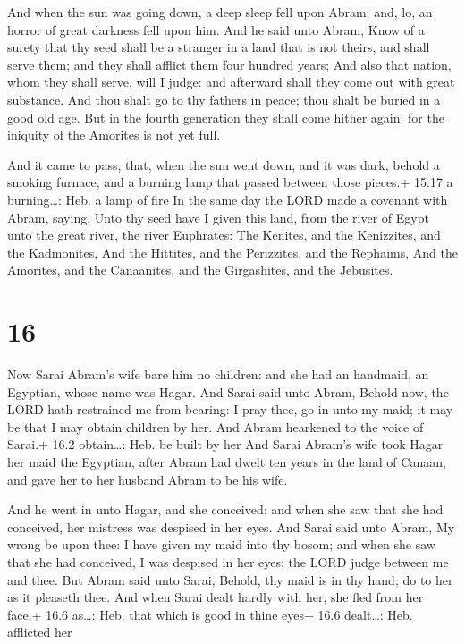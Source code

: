 And when the sun was going down, a deep sleep fell upon
Abram; and, lo, an horror of great darkness fell upon him. 
And he said unto Abram, Know of a surety that thy seed shall be a
stranger in a land that is not theirs, and shall serve them; and they
shall afflict them four hundred years;  And also that
nation, whom they shall serve, will I judge: and afterward shall they
come out with great substance.  And thou shalt go to thy
fathers in peace; thou shalt be buried in a good old age. 
But in the fourth generation they shall come hither again: for the
iniquity of the Amorites is not yet full.

 And it came to pass, that, when the sun went down, and it
was dark, behold a smoking furnace, and a burning lamp that passed
between those pieces.+ 15.17 a burning\ldots: Heb. a lamp of fire
 In the same day the LORD made a covenant with Abram,
saying, Unto thy seed have I given this land, from the river of Egypt
unto the great river, the river Euphrates:  The Kenites,
and the Kenizzites, and the Kadmonites,  And the Hittites,
and the Perizzites, and the Rephaims,  And the Amorites,
and the Canaanites, and the Girgashites, and the Jebusites.

\hypertarget{section-15}{%
\section{16}\label{section-15}}

 Now Sarai Abram's wife bare him no children: and she had an
handmaid, an Egyptian, whose name was Hagar.  And Sarai said
unto Abram, Behold now, the LORD hath restrained me from bearing: I pray
thee, go in unto my maid; it may be that I may obtain children by her.
And Abram hearkened to the voice of Sarai.+ 16.2 obtain\ldots: Heb. be
built by her  And Sarai Abram's wife took Hagar her maid the
Egyptian, after Abram had dwelt ten years in the land of Canaan, and
gave her to her husband Abram to be his wife.

 And he went in unto Hagar, and she conceived: and when
she saw that she had conceived, her mistress was despised in her eyes.
 And Sarai said unto Abram, My wrong be upon thee: I have
given my maid into thy bosom; and when she saw that she had conceived, I
was despised in her eyes: the LORD judge between me and thee.
 But Abram said unto Sarai, Behold, thy maid is in thy hand;
do to her as it pleaseth thee. And when Sarai dealt hardly with her, she
fled from her face.+ 16.6 as\ldots: Heb. that which is good in thine
eyes+ 16.6 dealt\ldots: Heb. afflicted her

